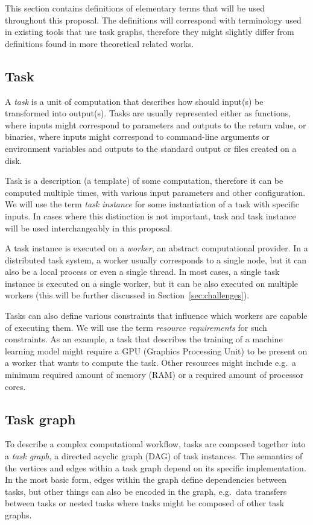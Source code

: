 This section contains definitions of elementary terms that will be used throughout this proposal.
The definitions will correspond with terminology used in existing tools that use task graphs,
therefore they might slightly differ from definitions found in more theoretical related works.

\subsection{Task}
A \emph{task} is a unit of computation that describes how should input(s) be transformed
into output(s). Tasks are usually represented either as functions, where inputs might correspond to
parameters and outputs to the return value, or binaries, where inputs might correspond to
command-line arguments or environment variables and outputs to the standard output or files created
on a disk.

Task is a description (a template) of some computation, therefore it can be computed multiple
times, with various input parameters and other configuration. We will use the term
\emph{task instance} for some instantiation of a task with specific inputs. In cases where this
distinction is not important, task and task instance will be used interchangeably in this proposal.

A task instance is executed on a \emph{worker}, an abstract computational provider. In a
distributed task system, a worker usually corresponds to a single node, but it can also be
a local process or even a single thread. In most cases, a single task instance is executed on a
single worker, but it can be also executed on multiple workers (this will be further discussed in
Section~\ref{sec:challenges}).

Tasks can also define various constraints that influence which workers are capable of executing
them. We will use the term \emph{resource requirements} for such constraints. As an example, a task
that describes the training of a machine learning model might require a GPU (Graphics Processing
Unit) to be present on a worker that wants to compute the task. Other resources might include
e.g.\ a minimum required amount of memory (RAM) or a required amount of processor cores.

\subsection{Task graph}
To describe a complex computational workflow, tasks are composed together into a \emph{task
graph}, a directed acyclic graph (DAG) of task instances. The semantics of the vertices and edges
within a task graph depend on its specific implementation. In the most basic form,
edges within the graph define dependencies between tasks, but other things can also be encoded
in the graph, e.g.\ data transfers between tasks or nested tasks where tasks might be composed
of other task graphs.

